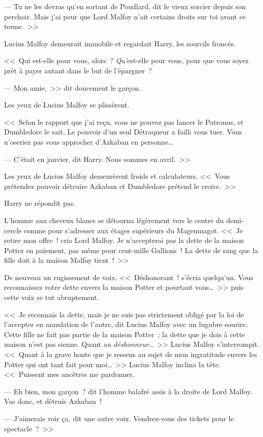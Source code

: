 --- Tu ne les devras qu'en sortant de Poudlard, dit le vieux sorcier depuis son perchoir. Mais j'ai peur que Lord Malfoy n'ait certains droits sur toi avant ce terme.~>>

Lucius Malfoy demeurait immobile et regardait Harry, les sourcils froncés.

<<~Qui est-elle pour vous, alors~? \emph{Qu'}est-elle pour vous, pour que vous soyez prêt à payer autant dans le but de l'épargner~?

--- Mon amie,~>> dit doucement le garçon.

Les yeux de Lucius Malfoy se plissèrent.

<<~Selon le rapport que j'ai reçu, vous ne pouvez pas lancer le Patronus, et Dumbledore le sait. Le pouvoir d'un seul Détraqueur a failli vous tuer. Vous n'oseriez pas vous approcher d'Azkaban en personne…

--- C'était en janvier, dit Harry. Nous sommes en avril.~>>

Les yeux de Lucius Malfoy demeurèrent froids et calculateurs. <<~Vous prétendez pouvoir détruire Azkaban et Dumbledore prétend le croire.~>>

Harry ne répondit pas.

L'homme aux cheveux blancs se détourna légèrement vers le centre du demi-cercle comme pour s'adresser aux étages supérieurs du Magenmagot. <<~Je retire mon offre~! cria Lord Malfoy. Je n'accepterai pas la dette de la maison Potter en paiement, pas même pour cent-mille Gallions~! La dette de sang que la fille doit à la maison Malfoy tient~!~>>

De nouveau un rugissement de voix. <<~Déshonorant~! s'écria quelqu'un. Vous reconnaissez votre dette envers la maison Potter et pourtant vous…~>> puis cette voix se tut abruptement.

<<~Je reconnais la dette, mais je ne suis pas strictement obligé par la loi de l'accepter en annulation de l'autre, dit Lucius Malfoy avec un lugubre sourire. Cette fille ne fait pas partie de la maison Potter~; la dette que je dois à cette maison n'est pas sienne. Quant au \emph{déshonneur}…~>> Lucius Malfoy s'interrompit. <<~Quant à la grave honte que je ressens au sujet de mon ingratitude envers les Potter qui ont tant fait pour moi…~>> Lucius Malfoy inclina la tête. <<~Puissent mes ancêtres me pardonner.

--- Eh bien, mon garçon~? dit l'homme balafré assis à la droite de Lord Malfoy. Vas donc, et détruis Azkaban~!

--- J'aimerais voir ça, dit une autre voix. Vendrez-vous des tickets pour le spectacle~?~>>

